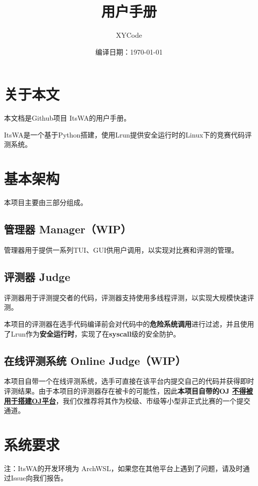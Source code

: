 \documentclass[UTF8]{ctexart}
\title{\textbf{\itswa 用户手册}}
\author{XYCode}
\date{编译日期：\today}
\newcommand{\itswa}{ItsWA}
\begin{document}
    \maketitle

    \tableofcontents
    \clearpage

    \section*{关于本文}
        本文档是Github项目 \itswa 的用户手册。

        \itswa 是一个基于Python搭建，使用Lrun提供安全运行时的Linux下的竞赛代码评测系统。
    
    \section{基本架构}
        本项目主要由三部分组成。

        \subsection{管理器 Manager（WIP）}
            管理器用于提供一系列TUI、GUI供用户调用，以实现对比赛和评测的管理。

        \subsection{评测器 Judge}
            评测器用于评测提交者的代码，评测器支持使用多线程评测，以实现大规模快速评测。

            本项目的评测器在选手代码编译前会对代码中的\textbf{危险系统调用}进行过滤，并且使用了Lrun作为\textbf{安全运行时}，实现了在\textbf{syscall}级的安全防护。

        \subsection{在线评测系统 Online Judge（WIP）}
            本项目自带一个在线评测系统，选手可直接在该平台内提交自己的代码并获得即时评测结果。由于本项目的评测器存在被卡的可能性，因此\textbf{本项目自带的OJ \uline{不得被用于搭建OJ平台}}，我们仅推荐将其作为校级、市级等小型非正式比赛的一个提交通道。
    
    \section{系统要求}
        注：\itswa 的开发环境为 ArchWSL，如果您在其他平台上遇到了问题，请及时通过Issue向我们报告。
\end{document}

